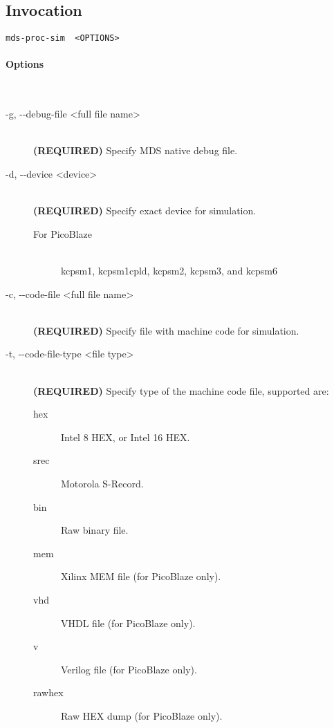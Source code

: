     \subsection{Invocation}
        \verb'mds-proc-sim  <OPTIONS>'

        \paragraph{Options}~\\
            \begin{description}
                \item[-g, -{}-debug-file <full file name>]~\\
                    \textbf{(REQUIRED)} Specify MDS native debug file.

                \item[-d, -{}-device <device>]~\\
                    \textbf{(REQUIRED)} Specify exact device for simulation.
                    \begin{description}
                        \item[For PicoBlaze]~\\
                            kcpsm1, kcpsm1cpld, kcpsm2, kcpsm3, and kcpsm6
                    \end{description}

                \item[-c, -{}-code-file <full file name>]~\\
                    \textbf{(REQUIRED)} Specify file with machine code for simulation.

                \item[-t, -{}-code-file-type <file type>]~\\
                    \textbf{(REQUIRED)} Specify type of the machine code file, supported are:
                    \begin{description}
                        \item [hex] Intel 8 HEX, or Intel 16 HEX.
                        \item [srec] Motorola S-Record.
                        \item [bin] Raw binary file.
                        \item [mem] Xilinx MEM file (for PicoBlaze only).
                        \item [vhd] VHDL file (for PicoBlaze only).
                        \item [v] Verilog file (for PicoBlaze only).
                        \item [rawhex] Raw HEX dump (for PicoBlaze only).
                    \end{description}


\end{description}
